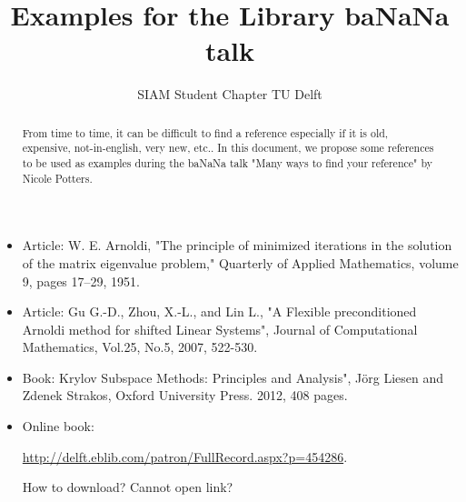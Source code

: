 \documentclass[a4paper,10pt]{article}
\title{Examples for the Library baNaNa talk}
\author{SIAM Student Chapter TU Delft}
\begin{document}
\maketitle

\begin{abstract}
From time to time, it can be difficult to find a reference especially if it is old, expensive, not-in-english, very new, etc..
In this document, we propose some references to be used as examples during the baNaNa talk "Many ways to find your reference" by Nicole Potters.
\end{abstract}
\begin{itemize}
 \item Article: W. E. Arnoldi, "The principle of minimized iterations in the solution of the matrix eigenvalue problem," Quarterly of Applied Mathematics, volume 9, pages 17--29, 1951.
\item Article: Gu G.-D., Zhou, X.-L., and Lin L., "A Flexible preconditioned Arnoldi method for shifted Linear Systems", Journal of Computational Mathematics, Vol.25, No.5, 2007, 522-530.
\item Book: Krylov Subspace Methods: Principles and Analysis", J\"{o}rg Liesen and Zdenek Strakos, Oxford University Press. 2012, 408 pages.
\item Online book: 

\url{http://delft.eblib.com/patron/FullRecord.aspx?p=454286}. 

How to download? Cannot open link?

 \end{itemize}
\end{document}
